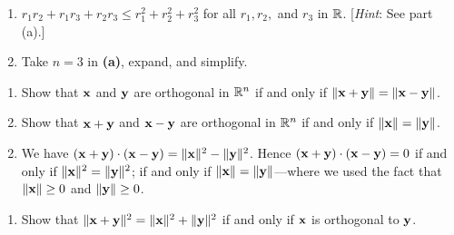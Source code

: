 \begin{multicols}{2}
\begin{ex}
\begin{enumerate}[label={\alph*.}]
\item $r_1r_2 + r_1r_3 + r_2r_3 \leq r_1^2 + r_2^2 + r_3^2$ for all $r_1, r_2,$ and $r_3$ in $\mathbb{R}$. [\textit{Hint}: See part (a).]

\end{enumerate}
\begin{sol}
\begin{enumerate}[label={\alph*.}]
\setcounter{enumi}{1}
\item  Take $n = 3$ in \textbf{(a)}, expand, and simplify.

\end{enumerate}
\end{sol}
\end{ex}

\begin{ex}
\begin{enumerate}[label={\alph*.}]
\item Show that $\textbf{x}$ and $\textbf{y}$ are orthogonal in $\mathbb{R}^n$ if and only if $\|\textbf{x} + \textbf{y}\| = \|\textbf{x} - \textbf{y}\|$.

\item Show that $\textbf{x} + \textbf{y}$ and $\textbf{x} - \textbf{y}$ are orthogonal in $\mathbb{R}^n$ if and only if $\|\textbf{x}\| = \|\textbf{y}\|$.

\end{enumerate}
\begin{sol}
\begin{enumerate}[label={\alph*.}]
\setcounter{enumi}{1}
\item  We have $(\textbf{x} + \textbf{y}) \cdot (\textbf{x} - \textbf{y}) = \|\textbf{x}\|^{2} - \|\textbf{y}\|^{2}$. Hence $(\textbf{x} + \textbf{y}) \cdot (\textbf{x} - \textbf{y}) = 0$ if and only if $\|\textbf{x}\|^{2} = \|\textbf{y}\|^{2}$; if and only if $\|\textbf{x}\| = \|\textbf{y}\|$---where we used the fact that $\|\textbf{x}\| \geq 0$ and $\|\textbf{y}\| \geq 0$.

\end{enumerate}
\end{sol}
\end{ex}

\begin{ex}
\begin{enumerate}[label={\alph*.}]
\item Show that $\|\textbf{x} + \textbf{y}\|^{2} = \|\textbf{x}\|^{2} + \|\textbf{y}\|^{2}$ if and only if $\textbf{x}$ is orthogonal to $\textbf{y}$.


\end{enumerate}
\end{ex}
\end{multicols}
